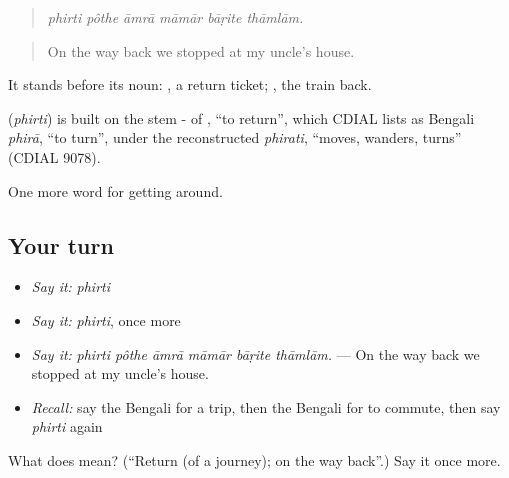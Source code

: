 \begin{quote}
\emph{phirti pôthe āmrā māmār bāṛite thāmlām.}
\end{quote}

\begin{quote}
On the way back we stopped at my uncle's house.
\end{quote}

It stands before its noun:  , a return ticket;  , the train back.

\begin{cousinweb}
\textbf{} (\emph{phirti}) is built on the stem - of \textbf{}, \textquotedblleft{}to return\textquotedblright{}, which CDIAL lists as Bengali \emph{phirā}, \textquotedblleft{}to turn\textquotedblright{}, under the reconstructed \emph{phirati}, \textquotedblleft{}moves, wanders, turns\textquotedblright{} (CDIAL 9078).
\end{cousinweb}

\begin{grammarlens}[title={What you've built}]
One more word for getting around.
\end{grammarlens}

\subsection*{Your turn}
\begin{itemize}
\raggedright
  \item \emph{Say it:} \emph{phirti}
  \item \emph{Say it:} \emph{phirti}, once more
  \item \emph{Say it:} \emph{phirti pôthe āmrā māmār bāṛite thāmlām.} — On the way back we stopped at my uncle's house.
  \item \emph{Recall:} say the Bengali for a trip, then the Bengali for to commute, then say \emph{phirti} again
\end{itemize}

\begin{tcolorbox}[breakable,colback=teal!4,colframe=teal!35!black,title={Before you move on}]
What does  mean? (\textquotedblleft{}Return (of a journey); on the way back\textquotedblright{}.) Say it once more.
\end{tcolorbox}
